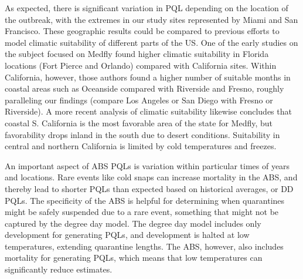 \documentclass[10pt,a4paper,twocolumn]{article}
\begin{document}

As expected, there is significant variation in PQL depending on the location of the outbreak, 
with the extremes in our study sites represented by Miami and San Francisco.
These geographic results could be
compared to previous efforts to model climatic suitability of different parts of the US.
One of the early studies on the subject focused on Medfly found higher climatic suitability in 
Florida locations (Fort Pierce and Orlando) compared with California 
sites\cite{messenger_bioclimatic_1954}. 
Within California, however, those authors found a higher number of suitable months in coastal 
areas such as Oceanside compared with Riverside and Fresno, roughly paralleling our 
findings (compare Los Angeles or San Diego with Fresno or Riverside).
A more recent analysis of climatic suitability likewise concludes that coastal 
S. California is the most favorable area of the state for Medfly, but 
favorability drops inland in the south due to desert conditions.
Suitability in central and northern California is limited by cold temperatures and 
freezes\cite{gutierrez_assessing_2011}. 




An important aspect of ABS PQLs is variation within particular times of years and locations. 
Rare events like cold snaps can increase mortality in the ABS,
and thereby lead to shorter PQLs than expected based on historical averages, or DD PQLs.
The specificity of the ABS is helpful for determining 
when quarantines might be safely suspended due to a rare event,
something that might not be captured by the degree day model.
The degree day model includes only development for generating PQLs,
and development is halted at low temperatures, extending quarantine lengths.
The ABS, however, also includes mortality for generating PQLs,
which means that low temperatures can significantly reduce estimates.
\end{document}
